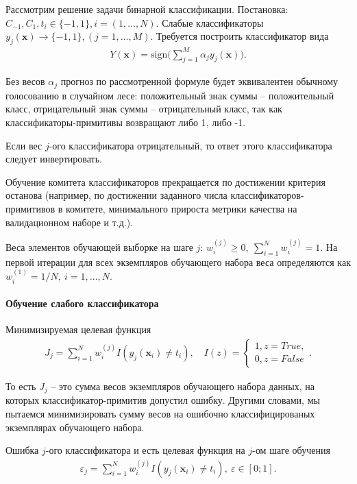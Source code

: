 \documentclass[%
	11pt,
	a4paper,
	utf8,
		]{article}
\begin{document}
Рассмотрим решение задачи бинарной классификации. Постановка: $ C_{-1}, C_1, t_i \in \{-1, 1\}, i = (1, \ldots, N) $. Слабые классификаторы $ y_j(\mathbf{x}) \rightarrow \{-1, 1\}, (j = 1,\ldots, M) $. Требуется построить классификатор вида
\begin{align*}
	Y(\mathbf{x}) = \text{sign} \Big(\sum_{j=1}^{M} \alpha_j y_j(\mathbf{x})\Big).
\end{align*}

Без весов $ \alpha_j $ прогноз по рассмотренной формуле будет эквивалентен обычному голосованию в случайном лесе: положительный знак суммы -- положительный класс, отрицательный знак суммы -- отрицательный класс, так как классификаторы-примитивы возвращают либо 1, либо -1.

Если вес $ j $-ого классификатора отрицательный, то ответ этого классификатора следует инвертировать.

Обучение комитета классификаторов прекращается по достижении критерия останова (например, по достижении заданного числа классификаторов-примитивов в комитете, минимального прироста метрики качества на валидационном наборе и т.д.).

Веса элементов обучающей выборке на шаге $ j $: $ w_i^{(j)} \geqslant 0,\ \sum\limits_{i=1}^N w_i^{(j)} = 1 $. На первой итерации для всех экземпляров обучающего набора веса определяются как $ w_i^{(1)} = 1/N,\ i = 1, \ldots, N $.

\paragraph{Обучение слабого классификатора} Минимизируемая целевая функция
\begin{align*}
	J_j = \sum_{i=1}^{N} w_i^{(j)} I(y_j(\mathbf{x}_i) \neq t_i), \quad I(z) =
	\begin{cases}
		1, z=True,\\
		0, z=False
	\end{cases}.
\end{align*} 

То есть $ J_j $ -- это сумма весов экземпляров обучающего набора данных, на которых классификатор-примитив допустил ошибку. Другими словами, мы пытаемся минимизировать сумму весов на ошибочно классифицированых экземплярах обучающего набора.

Ошибка $ j $-ого классификатора и есть целевая функция на $ j $-ом шаге обучения
\begin{align*}
	\varepsilon_j = \sum_{i=1}^{N} w_i^{(j)} I(y_j(\mathbf{x}_i) \neq t_i),\ \varepsilon \in [0; 1].
\end{align*}
\end{document}
